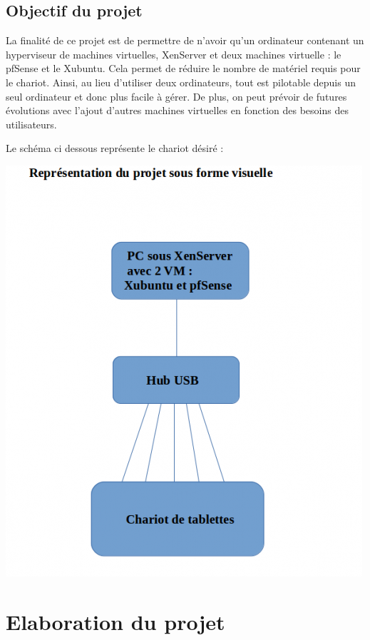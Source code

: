 \documentclass[a4paper,12pt]{extarticle}
\begin{document}
\clearpage
\subsection{Objectif du projet}

La finalité de ce projet est de permettre de n’avoir qu’un ordinateur contenant un hyperviseur de machines virtuelles, XenServer et deux machines virtuelle : le pfSense et le Xubuntu.
Cela permet de réduire le nombre de matériel requis pour le chariot. Ainsi, au lieu d’utiliser deux ordinateurs, tout est pilotable depuis un seul ordinateur et donc plus facile à gérer. De plus, on peut prévoir de futures évolutions avec l’ajout d’autres machines virtuelles en fonction des besoins des utilisateurs.

Le schéma ci dessous représente le chariot désiré :\\

\begin{center}
\includegraphics[scale=0.90]{representation_projet}
\end{center}

\clearpage
\section{Elaboration du projet}
\end{document}
